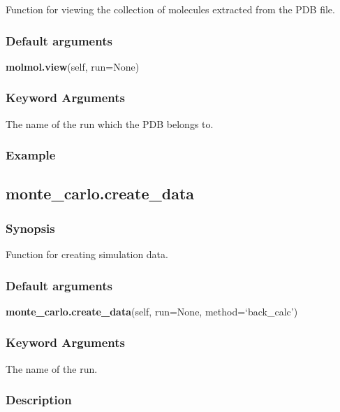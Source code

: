 Function for viewing the collection of molecules extracted from the PDB file.

\subsubsection{Default arguments}

\textsf{\textbf{molmol.view}(self, run=None)}


\subsubsection{Keyword Arguments}

  The name of the run which the PDB belongs to.

\subsubsection{Example}




\newpage

\subsection{monte\_carlo.create\_data}


\subsubsection{Synopsis}

Function for creating simulation data.

\subsubsection{Default arguments}

\textsf{\textbf{monte\_carlo.create\_data}(self, run=None, method=`back\_calc')}


\subsubsection{Keyword Arguments}

  The name of the run.


\subsubsection{Description}

